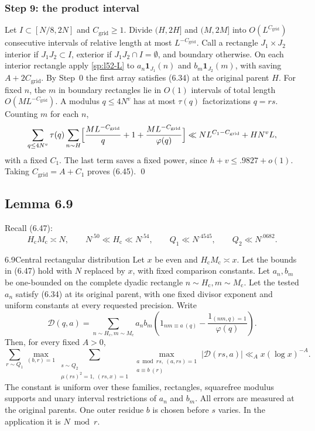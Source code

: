 \subsubsection*{Step 9: the product interval}
Let $I\subset[N/8,2N]$ and $C_{\mathrm{grid}}\ge1$. Divide $(H,2H]$ and
$(M,2M]$ into $O(L^{C_{\mathrm{grid}}})$ consecutive intervals of relative
length at most $L^{-C_{\mathrm{grid}}}$. Call a rectangle $J_1\times J_2$ interior if
$J_1J_2\subset I$, exterior if $J_1J_2\cap I=\emptyset$, and boundary
otherwise. On each interior rectangle apply \eqref{sp:l52-L} to
$a_n\mathbf1_{J_1}(n)$ and $b_m\mathbf1_{J_2}(m)$, with saving
$A+2C_{\mathrm{grid}}$. By Step~0 the first array satisfies (6.34) at the original
parent $H$. For fixed $n$, the $m$ in boundary rectangles lie in $O(1)$
intervals of total length $O(ML^{-C_{\mathrm{grid}}})$. A modulus $q\le4N^v$ has at
most $\tau(q)$ factorizations $q=rs$. Counting $m$ for each $n$,
\[
 \sum_{q\le4N^v}\tau(q)\sum_{n\sim H}
 \Bigl[\frac{ML^{-C_{\mathrm{grid}}}}q+1+\frac{ML^{-C_{\mathrm{grid}}}}{\varphi(q)}\Bigr]
 \ll NL^{C_1-C_{\mathrm{grid}}}+HN^vL ,
\]
with a fixed $C_1$. The last term saves a fixed power, since
$h+v\le.9827+o(1)$. Taking $C_{\mathrm{grid}}=A+C_1$ proves (6.45).
\qed

\subsection{Lemma 6.9}\label{subsec:supp-lem-69}

Recall (6.47):
\[
 H_{\mathrm c}M_{\mathrm c}\asymp N,\qquad
 N^{.50}\ll H_{\mathrm c}\ll N^{.54},\qquad
 Q_1\ll N^{.4545},\qquad Q_2\ll N^{.0682}.
 \tag{6.47}
\]

\begin{mainlemma}{6.9}{Central rectangular distribution}
Let \(x\) be even and \(H_{\mathrm c}M_{\mathrm c}\asymp x\). Let the
bounds in \textup{(6.47)} hold with \(N\) replaced by \(x\), with
fixed comparison constants. Let \(a_n,b_m\) be one-bounded on the complete
dyadic rectangle \(n\sim H_{\mathrm c},m\sim M_{\mathrm c}\). Let the
tested \(a_n\) satisfy \textup{(6.34)} at its original parent, with
one fixed divisor exponent and uniform constants at every requested
precision. Write
\[
 \mathcal D(q,a)=\sum_{n\sim H_{\mathrm c},m\sim M_{\mathrm c}}a_nb_m
 \left(1_{nm\equiv a\ (q)}-\frac{1_{(nm,q)=1}}{\varphi(q)}\right).
\]
Then, for every fixed \(A>0\),
\[
 \sum_{r\sim Q_1}\max_{(b,r)=1}
 \sum_{\substack{s\sim Q_2\\\mu(rs)^2=1,\ (rs,x)=1}}
 \max_{\substack{a\bmod rs,\ (a,rs)=1\\a\equiv b\ (r)}}
       |\mathcal D(rs,a)|\ll_A x(\log x)^{-A}.
 \tag{6.48}
\]
The constant is uniform over these families, rectangles, squarefree
modulus supports and unary interval restrictions of \(a_n\) and \(b_m\).
All errors are measured at the original parents. One outer residue
\(b\) is chosen before \(s\) varies. In the application it is
\(N\bmod r\).
\end{mainlemma}

